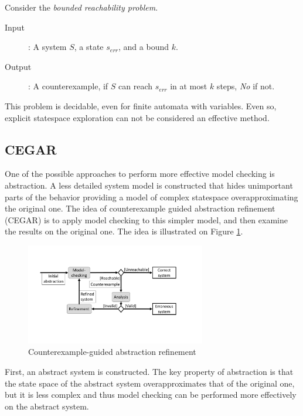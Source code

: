 Consider the \emph{bounded reachability problem}.
\begin{description}
	\item[Input]: A system $S$, a state $s_{err}$, and a bound $k$.
	\item[Output]: A counterexample, if $S$ can reach $s_{err}$ in at most $k$ steps, \emph{No} if not.
\end{description}

This problem is decidable, even for finite automata with variables. Even so, explicit statespace exploration can not be considered an effective method.

\subsection{CEGAR}

One of the possible approaches to perform more effective model checking is abstraction. A less detailed system model is constructed that hides unimportant parts of the behavior providing a model of complex statespace overapproximating the original one. The idea of counterexample guided abstraction refinement (CEGAR) \cite{clarke2003counterexample} is to apply 
model checking to this simpler model, and then examine the results on the original one. The idea is illustrated on
Figure \ref{fig:cegar}.


\begin{figure}
	\centering
	\includegraphics [width=0.7\textwidth] {include/figures/cegar_flow_black}
	\caption{Counterexample-guided abstraction refinement}
	\label{fig:cegar}
\end{figure}


First, an abstract system is constructed. The key property of abstraction is
that the state space of the abstract system overapproximates that of the original
one, but it is less complex and thus model checking can be performed more effectively on the abstract system.

